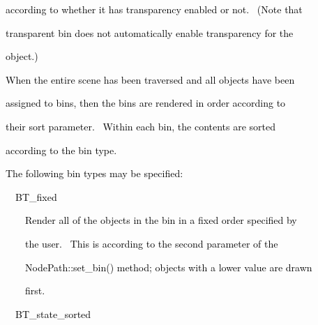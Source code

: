 \documentclass[a4paper]{article}
\newcommand\textstyleOOoComputerKeyWord[1]{\textrm{\textcolor[rgb]{0.0,0.0,0.5019608}{#1}}}
\begin{document}
{\color{black}
\textstyleOOoComputerKeyWord{\textcolor{black}{according to whether it has transparency enabled or not. \ (Note that}}}

\clearpage{\color{black}
\textstyleOOoComputerKeyWord{\textcolor{black}{the reverse is not true: explicitly assigning an object into the}}}

{\color{black}
\textstyleOOoComputerKeyWord{\textcolor{black}{{\textquotedbl}transparent{\textquotedbl} bin does not automatically
enable transparency for the}}}

{\color{black}
\textstyleOOoComputerKeyWord{\textcolor{black}{object.)}}}


\bigskip

{\color{black}
\textstyleOOoComputerKeyWord{\textcolor{black}{When the entire scene has been traversed and all objects have been}}}

{\color{black}
\textstyleOOoComputerKeyWord{\textcolor{black}{assigned to bins, then the bins are rendered in order according to}}}

{\color{black}
\textstyleOOoComputerKeyWord{\textcolor{black}{their sort parameter. \ Within each bin, the contents are sorted}}}

{\color{black}
\textstyleOOoComputerKeyWord{\textcolor{black}{according to the bin type.}}}


\bigskip

{\color{black}
\textstyleOOoComputerKeyWord{\textcolor{black}{The following bin types may be specified:}}}


\bigskip

{\color{black}
\textstyleOOoComputerKeyWord{\textcolor{black}{\ \ BT\_fixed}}}


\bigskip

{\color{black}
\textstyleOOoComputerKeyWord{\textcolor{black}{\ \ \ \ Render all of the objects in the bin in a fixed order specified
by}}}

{\color{black}
\textstyleOOoComputerKeyWord{\textcolor{black}{\ \ \ \ the user. \ This is according to the second parameter of the}}}

{\color{black}
\textstyleOOoComputerKeyWord{\textcolor{black}{\ \ \ \ NodePath::set\_bin() method; objects with a lower value are
drawn}}}

{\color{black}
\textstyleOOoComputerKeyWord{\textcolor{black}{\ \ \ \ first.}}}


\bigskip

{\color{black}
\textstyleOOoComputerKeyWord{\textcolor{black}{\ \ BT\_state\_sorted}}}
\end{document}
